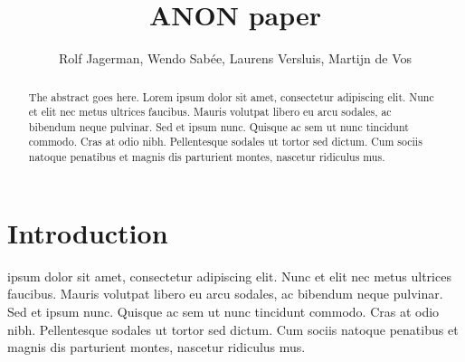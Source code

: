 \documentclass[journal]{IEEEtran}
\begin{document}
	\title{ANON paper}
	\author{Rolf Jagerman, Wendo Sab\'ee, Laurens Versluis, Martijn de Vos}


	\maketitle

	\begin{abstract}
		The abstract goes here. Lorem ipsum dolor sit amet, consectetur adipiscing elit. Nunc et elit nec metus ultrices faucibus. Mauris volutpat libero eu arcu sodales, ac bibendum neque pulvinar. Sed et ipsum nunc. Quisque ac sem ut nunc tincidunt commodo. Cras at odio nibh. Pellentesque sodales ut tortor sed dictum. Cum sociis natoque penatibus et magnis dis parturient montes, nascetur ridiculus mus. 
	\end{abstract}


	\section{Introduction}
		 ipsum dolor sit amet, consectetur adipiscing elit. Nunc et elit nec metus ultrices faucibus. Mauris volutpat libero eu arcu sodales, ac bibendum neque pulvinar. Sed et ipsum nunc. Quisque ac sem ut nunc tincidunt commodo. Cras at odio nibh. Pellentesque sodales ut tortor sed dictum. Cum sociis natoque penatibus et magnis dis parturient montes, nascetur ridiculus mus.
		
\end{document}
